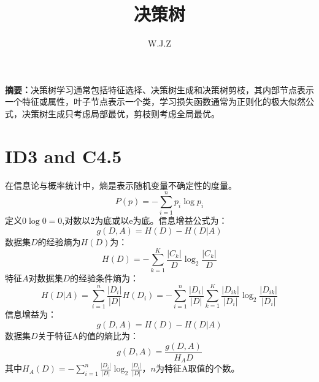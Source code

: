 \documentclass{article}
\title{决策树}
\author{W.J.Z}
\date{}
\begin{document}
	\maketitle
	\textbf{摘要：}决策树学习通常包括特征选择、决策树生成和决策树剪枝，其内部节点表示一个特征或属性，叶子节点表示一个类，学习损失函数通常为正则化的极大似然公式，决策树生成只考虑局部最优，剪枝则考虑全局最优。
	\section{ID3 and C4.5}
	在信息论与概率统计中，熵是表示随机变量不确定性的度量。
	\begin{equation}
	P\left ( p \right )=-\sum_{i=1}^{n}p_{i}\log p_{i}
	\end{equation}
	定义$0\log0 = 0$,对数以2为底或以e为底。信息增益公式为：
	\begin{equation}
	g\left ( D,A \right ) =H\left ( D \right ) -H\left ( D|A \right )
	\end{equation}
	数据集$D$的经验熵为$H(D)$为：
	\begin{equation}
	H\left ( D \right ) = -\sum_{k=1}^{K}\frac{\left | C_{k} \right |}{D}\log _{2}\frac{\left | C_{k} \right |}{D}
	\end{equation}
	特征$A$对数据集$D$的经验条件熵为：
	\begin{equation}
	H\left ( D|A \right )=\sum_{i=1}^{n}\frac{\left | D_{i} \right |}{\left | D \right |}H\left ( D_{i} \right )=-\sum_{i=1}^{n}\frac{\left | D_{i} \right |}{\left | D \right |}\sum_{k=1}^{K}\frac{\left | D_{ik} \right |}{\left | D_{i} \right |}\log _{2}\frac{\left | D_{ik} \right |}{\left | D_{i} \right |}	
	\end{equation}
	信息增益为：
	\begin{equation}
	g(D,A)=H(D)-H(D|A)
	\end{equation}
	数据集$D$关于特征A的值的熵比为：
	\begin{equation}
	g\left ( D,A \right )=\frac{g\left ( D,A \right )}{H_{A}D}
	\end{equation}
	其中$H_{A}\left ( D \right )=-\sum_{i=1}^{n}\frac{\left | D_{i} \right |}{\left | D \right |} \log _{2}\frac{\left | D_{i} \right |}{\left | D \right |}$，$n$为特征A取值的个数。
	\\
	
\end{document}
